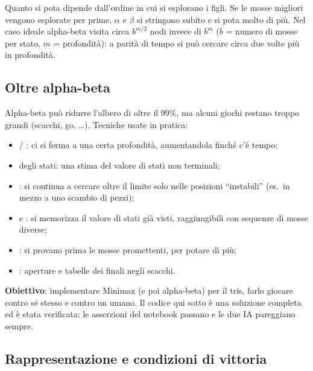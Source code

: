 \begin{osservazione}
Quanto si pota dipende dall'ordine in cui si esplorano i figli. Se le mosse migliori vengono
esplorate per prime, $\alpha$ e $\beta$ si stringono subito e si pota molto di più. Nel caso
ideale alpha-beta visita circa $b^{m/2}$ nodi invece di $b^{m}$ ($b$ = numero di mosse per
stato, $m$ = profondità): a parità di tempo si può cercare circa due volte più in profondità.
\end{osservazione}

\subsection{Oltre alpha-beta}

Alpha-beta può ridurre l'albero di oltre il 99\%, ma alcuni giochi restano troppo grandi
(scacchi, go, \ldots). Tecniche usate in pratica:
\begin{itemize}
  \item {} / : ci si ferma a una certa
        profondità, aumentandola finché c'è tempo;
  \item {} degli stati: una stima del valore di stati non terminali;
  \item {}: si continua a cercare oltre il limite solo nelle posizioni
        ``instabili'' (es.\ in mezzo a uno scambio di pezzi);
  \item {} e : si memorizza il valore di stati già visti,
        raggiungibili con sequenze di mosse diverse;
  \item {}: si provano prima le mosse promettenti, per potare di più;
  \item {}: aperture e tabelle dei finali negli scacchi.
\end{itemize}


\textbf{Obiettivo}: implementare Minimax (e poi alpha-beta) per il tris, farlo giocare
contro sé stesso e contro un umano. Il codice qui sotto è una soluzione completa ed è stata
verificata: le asserzioni del notebook passano e le due IA pareggiano sempre.

\subsection{Rappresentazione e condizioni di vittoria}

